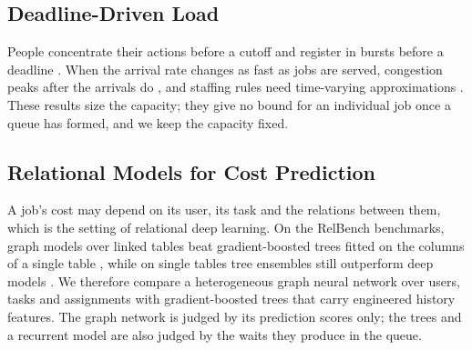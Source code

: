 \subsection{Deadline-Driven Load}

People concentrate their actions before a cutoff \cite{konig2005deadline} and register in
bursts before a deadline \cite{alfi2007deadline,alfi2009deadline}. When the arrival rate
changes as fast as jobs are served, congestion peaks after the arrivals do
\cite{massey1997peak}, and staffing rules need time-varying approximations
\cite{jennings1996staffing}. These results size the capacity; they give no bound for an
individual job once a queue has formed, and we keep the capacity fixed.

\subsection{Relational Models for Cost Prediction}

A job's cost may depend on its user, its task and the relations between them, which is the
setting of relational deep learning. On the RelBench benchmarks, graph models over linked
tables beat gradient-boosted trees fitted on the columns of a single table
\cite{robinson2024relbench}, while on single tables tree ensembles still outperform deep
models \cite{grinsztajn2022tabular}. We therefore compare a heterogeneous graph neural
network over users, tasks and assignments \cite{schlichtkrull2018rgcn,xu2019gin} with
gradient-boosted trees \cite{ke2017lightgbm} that carry engineered history features. The
graph network is judged by its prediction scores only; the trees and a recurrent model are
also judged by the waits they produce in the queue.
